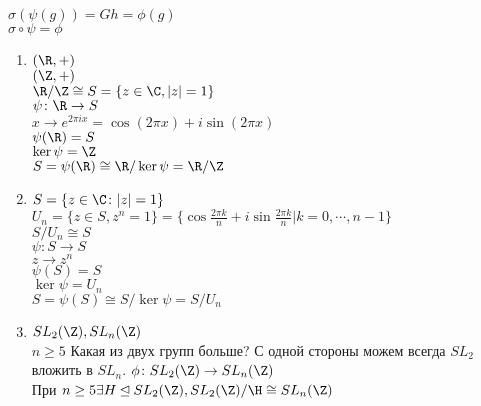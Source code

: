\begin{Rem}
$\sigma(\psi(g)) = Gh = \phi(g)$ \\
$\sigma \circ \psi = \phi$\\
\end{Rem}
\begin{exmp}\hfill
\begin{enumerate}
\item
$(\R, +)$\\
$(\Z, +)$\\
$\R / \Z \cong S = \{z \in \C, |z| = 1\}$ \\
$\psi\colon \R \to S$\\
$x \to e^{2\pi i x} = \cos(2\pi x) + i \sin(2\pi x)$\\
$\psi(\R) = S$\\
$\ker \psi = \Z$\\
$S = \psi(\R) \cong \R / \ker \psi = \R / \Z$\\
\item
$S = \{z \in \C \colon |z| = 1\}$\\
$U_n = \{z \in S, z^n = 1\} = \{\cos \frac{2\pi k}{n} + i \sin\frac{2\pi k}{n}| k = 0, \cdots, n - 1\}$\\
$S / U_n \cong S$\\
$\psi\colon S \to S$\\
$z \to z^{n}$\\
$\psi(S) = S$\\
$\ker \psi = U_n$\\
$S = \psi(S) \cong S / \ker \psi = S / U_n$\\
\item
$SL_2(\Z), SL_n(\Z)$\\
$n \ge 5$
Какая из двух групп больше? 
С одной стороны можем всегда $SL_2$ вложить в $SL_n$.
$\phi \colon SL_2(\Z) \to SL_n(\Z)$\\
При $n \ge 5 \exists H \unlhd SL_2(\Z), SL_2(\Z) / \H \cong SL_n(\Z)$
\end{enumerate}
\end{exmp}